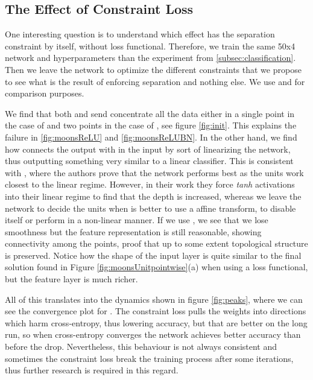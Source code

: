 \subsection{The Effect of Constraint Loss}\label{subsec:effectConstraintLoss}

One interesting question is to understand which effect has the separation constraint by itself, without loss functional. Therefore, we train the same 50x4 network and hyperparameters than the experiment from \ref{subsec:classification}. Then we leave the network to optimize the different constraints that we propose to see what is the result of enforcing separation and nothing else. We use \ReLU and \ReLUBN for comparison purposes. 

We find that both \ReLU and \ReLUBN send concentrate all the data either in a single point in the case of \ReLU and two points in the case of \ReLUBN, see figure \ref{fig:init}. This explains the failure in \ref{fig:moonsReLU} and \ref{fig:moonsReLUBN}. In the other hand, we find how \SepLayer connects the output with in the input by sort of linearizing the network, thus outputting something very similar to a linear classifier. This is consistent with \cite{batchnormGradientExplosion}, where the authors prove that the network performs best as the units work closest to the linear regime. However, in their work they force \emph{tanh} activations into their linear regime to find that the depth is increased, whereas we leave the network to decide the units when is better to use a affine transform, to disable itself or perform in a non-linear manner. If we use \SepUnitPoint, we see that we lose smoothness but the feature representation is still reasonable, showing connectivity among the points, proof that up to some extent topological structure is preserved. Notice how the shape of the input layer is quite similar to the final solution found in Figure \ref{fig:moonsUnitpointwise}(a) when using a loss functional, but the feature layer is much richer. 

All of this translates into the dynamics shown in figure \ref{fig:peaks}, where we can see the convergence plot for \SepUnitPoint. The constraint loss pulls the weights into directions which harm cross-entropy, thus lowering accuracy, but that are better on the long run, so when cross-entropy converges the network achieves better accuracy than before the drop. Nevertheless, this behaviour is not always consistent and sometimes the constraint loss break the training process after some iterations, thus further research is required in this regard.

